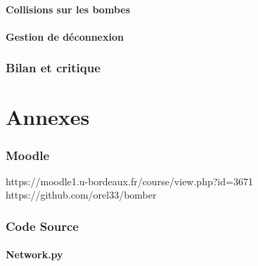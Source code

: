 \documentclass[a4paper]{article}
\begin{document}
		\subsection{Collisions sur les bombes}
		\subsection{Gestion de déconnexion}
	
	\section{Bilan et critique}
		
\newpage
\appendix
\part{Annexes}


\section{Moodle} \label{moodle}

https://moodle1.u-bordeaux.fr/course/view.php?id=3671
https://github.com/orel33/bomber

\newpage
\section{Code Source}

\subsection{Network.py} \label{network.py}
\end{document}

